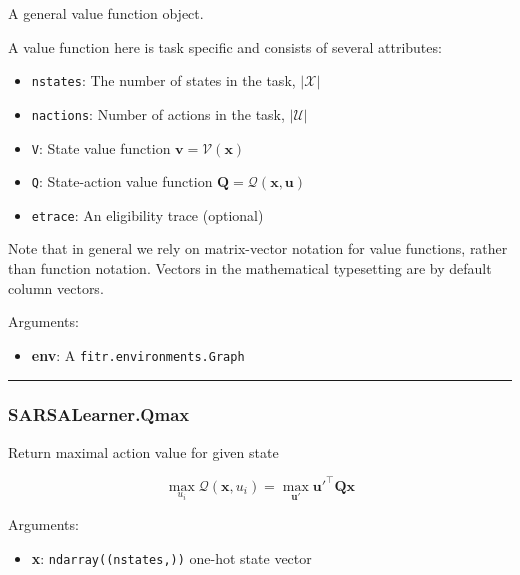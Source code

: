 A general value function object.

A value function here is task specific and consists of several
attributes:

\begin{itemize}
\tightlist
\item
  \texttt{nstates}: The number of states in the task, \(|\mathcal X|\)
\item
  \texttt{nactions}: Number of actions in the task, \(|\mathcal U|\)
\item
  \texttt{V}: State value function \(\mathbf v = \mathcal V(\mathbf x)\)
\item
  \texttt{Q}: State-action value function
  \(\mathbf Q = \mathcal Q(\mathbf x, \mathbf u)\)
\item
  \texttt{etrace}: An eligibility trace (optional)
\end{itemize}

Note that in general we rely on matrix-vector notation for value
functions, rather than function notation. Vectors in the mathematical
typesetting are by default column vectors.

Arguments:

\begin{itemize}
\tightlist
\item
  \textbf{env}: A \texttt{fitr.environments.Graph}
\end{itemize}

\begin{center}\rule{0.5\linewidth}{\linethickness}\end{center}

\hypertarget{sarsalearner.qmax}{%
\subsubsection{SARSALearner.Qmax}\label{sarsalearner.qmax}}

\begin{Shaded}
\begin{Highlighting}[]
\end{Highlighting}
\end{Shaded}

Return maximal action value for given state

\[
\max_{u_i}\mathcal Q(\mathbf x, u_i) = \max_{\mathbf u'} \mathbf u'^\top \mathbf Q \mathbf x
\]

Arguments:

\begin{itemize}
\tightlist
\item
  \textbf{x}: \texttt{ndarray((nstates,))} one-hot state vector
\end{itemize}

